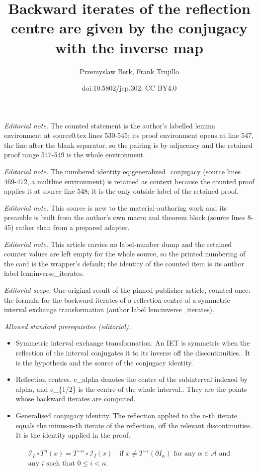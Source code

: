 \documentclass[10pt,a4paper]{article}
\title{Backward iterates of the reflection centre are given by the conjugacy with the inverse map}
\author{Przemyslaw Berk, Frank Trujillo}
\date{doi:10.5802/jep.302; CC BY4.0}
\theoremstyle{plain}
\theoremstyle{definition}
\newcommand{\A}{\mathcal{A}}
\begin{document}
\maketitle
\noindent\textit{Editorial note.} The counted statement is the author's labelled lemma environment at source0.tex lines 530-545; its proof environment opens at line 547, the line after the blank separator, so the pairing is by adjacency and the retained proof range 547-549 is the whole environment.\par\medskip
\noindent\textit{Editorial note.} The numbered identity eq:generalized\_conjugacy (source lines 469-472, a multline environment) is retained as context because the counted proof applies it at source line 548; it is the only outside label of the retained proof.\par\medskip
\noindent\textit{Editorial note.} This source is new to the material-authoring work and its preamble is built from the author's own macro and theorem block (source lines 8-45) rather than from a prepared adapter.\par\medskip
\noindent\textit{Editorial note.} This article carries no label-number dump and the retained counter values are left empty for the whole source, so the printed numbering of the card is the wrapper's default; the identity of the counted item is its author label lem:inverse\_iterates.\par\medskip
\noindent\textit{Editorial scope.} One original result of the pinned publisher article, counted once: the formula for the backward iterates of a reflection centre of a symmetric interval exchange transformation (author label lem:inverse\_iterates).\par\medskip
\noindent\textit{Allowed standard prerequisites (editorial).}\begin{itemize}
\item Symmetric interval exchange transformation. An IET is symmetric when the reflection of the interval conjugates it to its inverse off the discontinuities.. It is the hypothesis and the source of the conjugacy identity.
\item Reflection centres. c\_alpha denotes the centre of the subinterval indexed by alpha, and c\_\{1/2\} is the centre of the whole interval.. They are the points whose backward iterates are computed.
\item Generalised conjugacy identity. The reflection applied to the n-th iterate equals the minus-n-th iterate of the reflection, off the relevant discontinuities.. It is the identity applied in the proof.
\end{itemize}\medskip
\begin{multline}
\label{eq:generalized_conjugacy}
\mathcal{I}_I\circ T^n(x)=T^{-n}\circ\mathcal{I}_I(x) \quad \text{if } x \neq T^{-i}(\partial I_\alpha) \text{ for any } \alpha \in \A \text{ and}\\ \text{any $i$ such that } 0 \leq i < n.
\end{multline}
\end{document}
